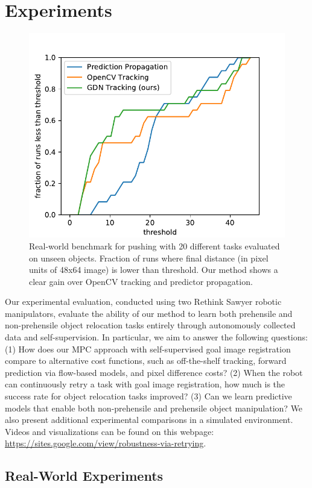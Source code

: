 
\vspace{-0.1cm}
\section{Experiments}
\vspace{-0.2cm}

\begin{figure}
\vspace{-0.3in}
\centering
\includegraphics[width=0.35\columnwidth]{images/pushing_score_cdf_robot.pdf}
\caption{\small{Real-world benchmark for pushing with 20 different tasks evaluated on unseen objects. Fraction of runs where final distance (in pixel units of 48x64 image) is lower than threshold. Our method shows a clear gain over OpenCV tracking and predictor propagation.}}
\label{fig:push_bench}
\vspace{-0.3in}
\end{figure}

Our experimental evaluation, conducted using two Rethink Sawyer robotic manipulators, evaluate the ability of our method to learn both prehensile and non-prehensile object relocation tasks entirely through autonomously collected data and self-supervision. In particular, we aim to answer the following questions: (1) How does our MPC approach with self-supervised goal image registration compare to alternative cost functions, such as off-the-shelf tracking, forward prediction via flow-based models, and pixel difference costs? (2) When the robot can continuously retry a task with goal image registration, how much is the success rate for object relocation tasks improved? (3) Can we learn predictive models that enable both non-prehensile and prehensile object manipulation? We also present additional experimental comparisons in a simulated environment.
Videos and visualizations can be found on this webpage: \url{https://sites.google.com/view/robustness-via-retrying}.

\subsection{Real-World Experiments}

